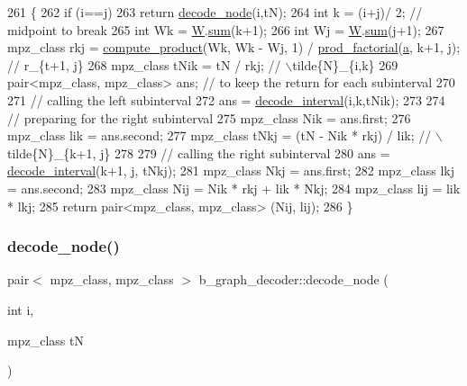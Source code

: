 \begin{DoxyCode}
261 \{
262   \textcolor{keywordflow}{if} (i==j)
263     \textcolor{keywordflow}{return} \hyperlink{classb__graph__decoder_a3d6d38da4436a92ebd01693cd3eb7c16}{decode\_node}(i,tN);
264   \textcolor{keywordtype}{int} k = (i+j)/ 2; \textcolor{comment}{// midpoint to break}
265   \textcolor{keywordtype}{int} Wk = \hyperlink{classb__graph__decoder_a2c3f91db1f54ddfd411f74d18b01b606}{W}.\hyperlink{classreverse__fenwick__tree_a672731fd6395b4853430073a099a80e6}{sum}(k+1);
266   \textcolor{keywordtype}{int} Wj = \hyperlink{classb__graph__decoder_a2c3f91db1f54ddfd411f74d18b01b606}{W}.\hyperlink{classreverse__fenwick__tree_a672731fd6395b4853430073a099a80e6}{sum}(j+1);
267   mpz\_class rkj = \hyperlink{compression__helper_8cpp_ae2afb43aabe50f7d42aae8f82b5a35f4}{compute\_product}(Wk, Wk - Wj, 1) / 
      \hyperlink{compression__helper_8cpp_a86d8a20e022dc06b23df3b08ac10b7d1}{prod\_factorial}(\hyperlink{classb__graph__decoder_afcf783e4199fb8f9d6828db08bb12333}{a}, k+1, j); \textcolor{comment}{// r\_\{t+1, j\}}
268   mpz\_class tNik = tN / rkj; \textcolor{comment}{// \(\backslash\)tilde\{N\}\_\{i,k\}}
269   pair<mpz\_class, mpz\_class> ans; \textcolor{comment}{// to keep the return for each subinterval}
270 
271   \textcolor{comment}{// calling the left subinterval }
272   ans = \hyperlink{classb__graph__decoder_ae8b20698e015819cbdb8da7997888fd8}{decode\_interval}(i,k,tNik);
273 
274   \textcolor{comment}{// preparing for the right subinterval}
275   mpz\_class Nik = ans.first;
276   mpz\_class lik = ans.second;
277   mpz\_class tNkj = (tN - Nik * rkj) / lik; \textcolor{comment}{// \(\backslash\)tilde\{N\}\_\{k+1, j\}}
278 
279   \textcolor{comment}{// calling the right subinterval}
280   ans = \hyperlink{classb__graph__decoder_ae8b20698e015819cbdb8da7997888fd8}{decode\_interval}(k+1, j, tNkj);
281   mpz\_class Nkj = ans.first;
282   mpz\_class lkj = ans.second;
283   mpz\_class Nij = Nik * rkj + lik * Nkj;
284   mpz\_class lij = lik * lkj;
285   \textcolor{keywordflow}{return} pair<mpz\_class, mpz\_class> (Nij, lij);
286 \}
\end{DoxyCode}
\mbox{\label{classb__graph__decoder_a3d6d38da4436a92ebd01693cd3eb7c16}} 
\subsubsection{\texorpdfstring{decode\+\_\+node()}{decode\_node()}}
{\footnotesize\ttfamily pair$<$ mpz\+\_\+class, mpz\+\_\+class $>$ b\+\_\+graph\+\_\+decoder\+::decode\+\_\+node (\begin{DoxyParamCaption}\item[{int}]{i,  }\item[{mpz\+\_\+class}]{tN }\end{DoxyParamCaption})}



